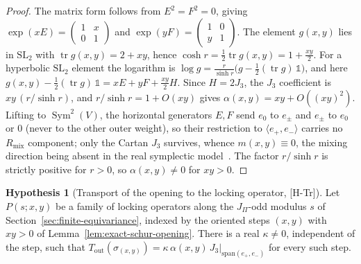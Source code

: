 \documentclass[11pt]{article}
\theoremstyle{definition}
\newtheorem{hypothesis}{Hypothesis}
\begin{document}
    \begin{proof}
      The matrix form follows from $E^2=F^2=0$, giving
      $\exp(xE)=\left(\begin{smallmatrix}1&x\\0&1\end{smallmatrix}\right)$ and
      $\exp(yF)=\left(\begin{smallmatrix}1&0\\y&1\end{smallmatrix}\right)$.
      The element $g(x,y)$ lies in $\mathrm{SL}_2$ with $\operatorname{tr}g(x,y)=2+xy$, hence
      $\cosh r=\tfrac12\operatorname{tr}g(x,y)=1+\tfrac{xy}{2}$.
      For a hyperbolic $\mathrm{SL}_2$ element the logarithm is
      $\log g=\frac{r}{\sinh r}\big(g-\tfrac12(\operatorname{tr}g)\,\mathbb 1\big)$, and here
      $g(x,y)-\tfrac12(\operatorname{tr}g)\,\mathbb 1=xE+yF+\tfrac{xy}{2}H$.
      Since $H=2J_3$, the $J_3$ coefficient is $xy\,(r/\sinh r)$, and $r/\sinh r=1+O(xy)$ gives
      $\alpha(x,y)=xy+O((xy)^2)$.
      Lifting to $\operatorname{Sym}^2(V)$, the horizontal generators $E,F$ send $e_0$ to $e_\pm$ and $e_\pm$ to $e_0$ or $0$
      (never to the other outer weight), so their restriction to $\langle e_+,e_-\rangle$ carries no $R_{\mathrm{mix}}$
      component; only the Cartan $J_3$ survives, whence $m(x,y)\equiv0$, the mixing direction being absent in the
      real symplectic model~\cite{Beau2026q14}.
      The factor $r/\sinh r$ is strictly positive for $r>0$, so $\alpha(x,y)\neq0$ for $xy>0$.
    \end{proof}

    \begin{hypothesis}[Transport of the opening to the locking operator, {[H-Tr]}]
      \label{hyp:transport}
      Let $P(s;x,y)$ be a family of locking operators along the $J_\Pi$-odd modulus $s$ of
      Section~\ref{sec:finite-equivariance}, indexed by the oriented steps $(x,y)$ with
      $xy>0$ of Lemma~\ref{lem:exact-schur-opening}.
      There is a real $\kappa\neq0$, independent of the step, such that
      $T_{\mathrm{out}}(\sigma_{(x,y)})
      =\kappa\,\alpha(x,y)\,J_3\big|_{\mathrm{span}(e_+,e_-)}$
      for every such step.
    \end{hypothesis}
\end{document}
